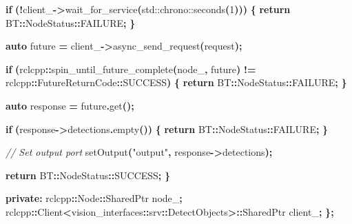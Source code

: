 \documentclass[
]{article}
\newenvironment{Shaded}{\begin{snugshade}}{\end{snugshade}}
\newcommand{\BuiltInTok}[1]{#1}
\newcommand{\CommentTok}[1]{\textcolor[rgb]{0.56,0.35,0.01}{\textit{#1}}}
\newcommand{\ControlFlowTok}[1]{\textcolor[rgb]{0.13,0.29,0.53}{\textbf{#1}}}
\newcommand{\DecValTok}[1]{\textcolor[rgb]{0.00,0.00,0.81}{#1}}
\newcommand{\KeywordTok}[1]{\textcolor[rgb]{0.13,0.29,0.53}{\textbf{#1}}}
\newcommand{\NormalTok}[1]{#1}
\newcommand{\OperatorTok}[1]{\textcolor[rgb]{0.81,0.36,0.00}{\textbf{#1}}}
\newcommand{\StringTok}[1]{\textcolor[rgb]{0.31,0.60,0.02}{#1}}
\newcommand{\VariableTok}[1]{\textcolor[rgb]{0.00,0.00,0.00}{#1}}
\begin{document}
\begin{Shaded}
\begin{Highlighting}[]
        \ControlFlowTok{if} \OperatorTok{(!}\VariableTok{client\_}\OperatorTok{{-}\textgreater{}}\NormalTok{wait\_for\_service}\OperatorTok{(}\BuiltInTok{std::}\NormalTok{chrono::seconds}\OperatorTok{(}\DecValTok{1}\OperatorTok{)))} \OperatorTok{\{}
            \ControlFlowTok{return}\NormalTok{ BT}\OperatorTok{::}\NormalTok{NodeStatus}\OperatorTok{::}\NormalTok{FAILURE}\OperatorTok{;}
        \OperatorTok{\}}

        \KeywordTok{auto}\NormalTok{ future }\OperatorTok{=} \VariableTok{client\_}\OperatorTok{{-}\textgreater{}}\NormalTok{async\_send\_request}\OperatorTok{(}\NormalTok{request}\OperatorTok{);}

        \ControlFlowTok{if} \OperatorTok{(}\NormalTok{rclcpp}\OperatorTok{::}\NormalTok{spin\_until\_future\_complete}\OperatorTok{(}\VariableTok{node\_}\OperatorTok{,}\NormalTok{ future}\OperatorTok{)} \OperatorTok{!=}
\NormalTok{            rclcpp}\OperatorTok{::}\NormalTok{FutureReturnCode}\OperatorTok{::}\NormalTok{SUCCESS}\OperatorTok{)} \OperatorTok{\{}
            \ControlFlowTok{return}\NormalTok{ BT}\OperatorTok{::}\NormalTok{NodeStatus}\OperatorTok{::}\NormalTok{FAILURE}\OperatorTok{;}
        \OperatorTok{\}}

        \KeywordTok{auto}\NormalTok{ response }\OperatorTok{=}\NormalTok{ future}\OperatorTok{.}\NormalTok{get}\OperatorTok{();}

        \ControlFlowTok{if} \OperatorTok{(}\NormalTok{response}\OperatorTok{{-}\textgreater{}}\NormalTok{detections}\OperatorTok{.}\NormalTok{empty}\OperatorTok{())} \OperatorTok{\{}
            \ControlFlowTok{return}\NormalTok{ BT}\OperatorTok{::}\NormalTok{NodeStatus}\OperatorTok{::}\NormalTok{FAILURE}\OperatorTok{;}
        \OperatorTok{\}}

        \CommentTok{// Set output port}
\NormalTok{        setOutput}\OperatorTok{(}\StringTok{"output"}\OperatorTok{,}\NormalTok{ response}\OperatorTok{{-}\textgreater{}}\NormalTok{detections}\OperatorTok{);}

        \ControlFlowTok{return}\NormalTok{ BT}\OperatorTok{::}\NormalTok{NodeStatus}\OperatorTok{::}\NormalTok{SUCCESS}\OperatorTok{;}
    \OperatorTok{\}}

\KeywordTok{private}\OperatorTok{:}
\NormalTok{    rclcpp}\OperatorTok{::}\NormalTok{Node}\OperatorTok{::}\NormalTok{SharedPtr }\VariableTok{node\_}\OperatorTok{;}
\NormalTok{    rclcpp}\OperatorTok{::}\NormalTok{Client}\OperatorTok{\textless{}}\NormalTok{vision\_interfaces}\OperatorTok{::}\NormalTok{srv}\OperatorTok{::}\NormalTok{DetectObjects}\OperatorTok{\textgreater{}::}\NormalTok{SharedPtr }\VariableTok{client\_}\OperatorTok{;}
\OperatorTok{\};}
\end{Highlighting}
\end{Shaded}
\end{document}
